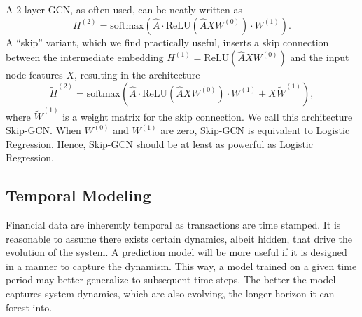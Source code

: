 \documentclass[sigconf,submission]{acmart}
\begin{document}

A 2-layer GCN, as often used, can be neatly written as
\[
H^{(2)}=\text{softmax}(\widehat{A}\cdot\text{ReLU}(\widehat{A}XW^{(0)})\cdot W^{(1)}).
\]
A ``skip'' variant, which we find practically useful, inserts a skip connection between the intermediate embedding $H^{(1)}=\text{ReLU}(\widehat{A}XW^{(0)})$ and the input node features $X$, resulting in the architecture
\[
\widetilde{H}^{(2)}=\text{softmax}(\widehat{A}\cdot\text{ReLU}(\widehat{A}XW^{(0)})\cdot W^{(1)}+X\widetilde{W}^{(1)}),
\]
where $\widetilde{W}^{(1)}$ is a weight matrix for the skip connection.
We call this architecture Skip-GCN. When $W^{(0)}$ and $W^{(1)}$ are zero, Skip-GCN is equivalent to Logistic Regression. Hence, Skip-GCN should be at least as powerful as Logistic Regression.

\subsection{Temporal Modeling}
Financial data are inherently temporal as transactions are time stamped. It is reasonable to assume there exists certain dynamics, albeit hidden, that drive the evolution of the system. A prediction model will be more useful if it is designed in a manner to capture the dynamism. This way, a model trained on a given time period may better generalize to subsequent time steps. The better the model captures system dynamics, which are also evolving, the longer horizon it can forest into.
\end{document}
